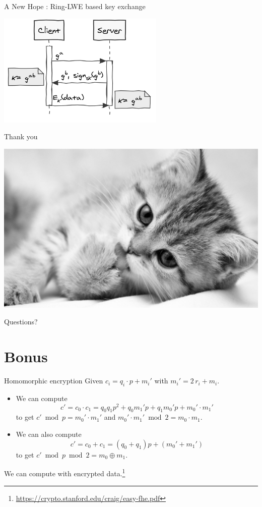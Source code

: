 \documentclass[presentation,smaller]{beamer}
\begin{document}
\begin{frame}[label={sec:orgheadline36}]{A New Hope  : Ring-LWE based key exchange}
\begin{center}
\includegraphics[width=0.6\textwidth]{keyex.png}
\end{center}
\end{frame}

\begin{frame}[label={sec:orgheadline37}]{Thank you}
\begin{center}
\includegraphics[width=.9\linewidth]{./kitten-01.jpg}

\alert{\Large Questions?}
\end{center}
\end{frame}

\section{Bonus}
\label{sec:orgheadline40}

\begin{frame}[label={sec:orgheadline39}]{Homomorphic encryption}
Given \(c_i = q_i ⋅ p + m_i'\) with \(m_i' = 2\,r_i + m_i\).
\begin{itemize}
\item We can compute \[c' = c_0 ⋅ c_1 = q_0 q_1 p^2 + q_0 m_1' p  + q_1 m_0' p + m_0' ⋅ m_1'\] to get \(c' \bmod p =  m_0' ⋅ m_1'\) and \(m_0' ⋅ m_1' \bmod 2 = m_0 ⋅ m_1\).
\item We can also compute \[c' = c_0 + c_1 = (q_0 + q_1) p + (m_0' + m_1')\] to get \(c' \bmod p \bmod 2 = m_0 \oplus m_1\).
\end{itemize}

We can compute with encrypted data.\footnote{\url{https://crypto.stanford.edu/craig/easy-fhe.pdf}}
\end{frame}
\end{document}
